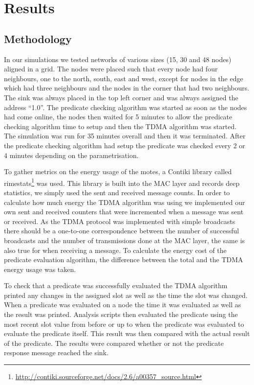 \section{Results}

\subsection{Methodology}

In our simulations we tested networks of various sizes (15, 30 and 48 nodes) aligned in a grid. The nodes were placed such that every node had four neighbours, one to the north, south, east and west, except for nodes in the edge which had three neighbours and the nodes in the corner that had two neighbours. The sink was always placed in the top left corner and was always assigned the address ``1.0''. The predicate checking algorithm was started as soon as the nodes had come online, the nodes then waited for 5 minutes to allow the predicate checking algorithm time to setup and then the TDMA algorithm was started. The simulation was run for 35 minutes overall and then it was terminated. After the predicate checking algorithm had setup the predicate was checked every 2 or 4 minutes depending on the parametrisation.

To gather metrics on the energy usage of the motes, a Contiki library called rimestats\footnote{\url{http://contiki.sourceforge.net/docs/2.6/a00357\_source.html}} was used. This library is built into the MAC layer and records deep statistics, we simply used the sent and received message counts. In order to calculate how much energy the TDMA algorithm was using we implemented our own sent and received counters that were incremented when a message was sent or received. As the TDMA protocol was implemented with simple broadcasts there should be a one-to-one correspondence between the number of successful broadcasts and the number of transmissions done at the MAC layer, the same is also true for when receiving a message. To calculate the energy cost of the predicate evaluation algorithm, the difference between the total and the TDMA energy usage was taken.

To check that a predicate was successfully evaluated the TDMA algorithm printed any changes in the assigned slot as well as the time the slot was changed. When a predicate was evaluated on a node the time it was evaluated as well as the result was printed. Analysis scripts then evaluated the predicate using the most recent slot value from before or up to when the predicate was evaluated to evaluate the predicate itself. This result was then compared with the actual result of the predicate. The results were compared whether or not the predicate response message reached the sink.

